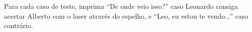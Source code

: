 Para cada caso de teste, imprima ``De onde veio isso?'' caso Leonardo consiga acertar Alberto com o laser através do espelho, e ``Leo, eu estou te vendo...'' caso contrário.